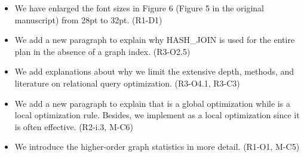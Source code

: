 \begin{itemize}
	\item We have enlarged the font sizes in Figure 6 (Figure 5 in the original manuscript) from 28pt to 32pt. (R1-D1)
	\item We add a new paragraph to explain why HASH\_JOIN is used for the entire plan in the absence of a graph index. (R3-O2.5)
	\item We add explanations about why we limit the extensive depth, methods, and literature on relational query optimization. (R3-O4.1, R3-C3)
	\item We add a new paragraph to explain that \filterrule is a global optimization while \fusionrule is a local optimization rule. Besides, we implement \filterrule as a local optimization since it is often effective. (R2-i.3, M-C6)
	\item We introduce the higher-order graph statistics in more detail. (R1-O1, M-C5)
\end{itemize}

